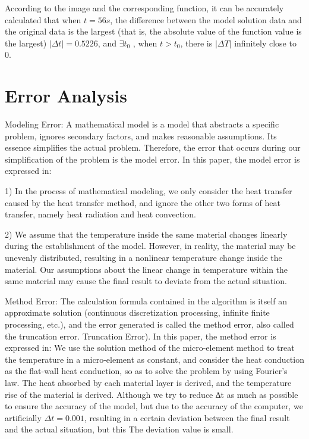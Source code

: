 \documentclass[12pt]{ctexart}
\begin{document}
According to the image and the corresponding function, it can be accurately calculated that when $t = 56s$, the difference between the model solution data and the original data is the largest (that is, the absolute value of the function value is the largest) $|\Delta t| = 0.5226$, and $\exists t_0$ , when $t > t_0$, there is $|\Delta T|$ infinitely close to 0.

\section{Error Analysis}
Modeling Error\cite{taylor1997introduction}: A mathematical model is a model that abstracts a specific problem, ignores secondary factors, and makes reasonable assumptions. Its essence simplifies the actual problem. Therefore, the error that occurs during our simplification of the problem is the model error. In this paper, the model error is expressed in:

1) In the process of mathematical modeling, we only consider the heat transfer caused by the heat transfer method, and ignore the other two forms of heat transfer, namely heat radiation and heat convection.

2) We assume that the temperature inside the same material changes linearly during the establishment of the model. However, in reality, the material may be unevenly distributed, resulting in a nonlinear temperature change inside the material. Our assumptions about the linear change in temperature within the same material may cause the final result to deviate from the actual situation.

Method Error\cite{bevington1993data}: The calculation formula contained in the algorithm is itself an approximate solution (continuous discretization processing, infinite finite processing, etc.), and the error generated is called the method error, also called the truncation error. Truncation Error). In this paper, the method error is expressed in: We use the solution method of the micro-element method to treat the temperature in a micro-element as constant, and consider the heat conduction as the flat-wall heat conduction, so as to solve the problem by using Fourier's law. The heat absorbed by each material layer is derived, and the temperature rise of the material is derived. Although we try to reduce ∆t as much as possible to ensure the accuracy of the model, but due to the accuracy of the computer, we artificially $\Delta t = 0.001$, resulting in a certain deviation between the final result and the actual situation, but this The deviation value is small.

\newpage



\end{document}
